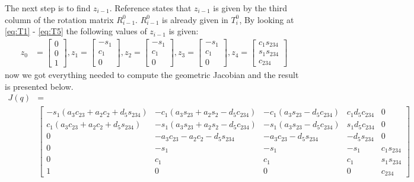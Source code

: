 The next step is to find $z_{i-1}$. Reference \cite{Siciliano} states that $z_{i-1}$ is given by the third column of the rotation matrix $R_{i-1}^0$. $R_{i-1}^0$ is already given in $T_i^0$, By looking at \eqref{eq:T1} - \eqref{eq:T5} the following values of $z_{i-1}$ is given:
\begin{align*}
    z_0 &= \begin{bmatrix}0\\0\\1\end{bmatrix},
    z_1 = \begin{bmatrix}-s_1\\c_1\\0\end{bmatrix},
    z_2 = \begin{bmatrix}-s_1\\c_1\\0\end{bmatrix},
    z_3 = \begin{bmatrix}-s_1\\c_1\\0\end{bmatrix},
    z_4 = \begin{bmatrix}c_1s_{234}\\s_1s_{234}\\c_{234}\end{bmatrix}
\end{align*}
now we got everything needed to compute the geometric Jacobian and the result is presented below.
\begin{align*}
    J(q) &= \\
    &\begin{bmatrix}
        -s_1(a_3c_{23} + a_2c_{2} + d_5s_{234}) & 
        -c_1(a_3s_{23} + a_2s_{2} - d_5c_{234}) & 
        -c_1(a_3s_{23} - d_5c_{234})            & 
        c_1d_5c_{234}                           & 
        0\\
        c_1(a_3c_{23} + a_2c_{2} + d_5s_{234})  & 
        -s_1(a_3s_{23} + a_2s_{2} - d_5c_{234}) & 
        -s_1(a_3s_{23} - d_5c_{234})            & 
        s_1d_5c_{234}                           & 
        0\\
        0                                       &
        -a_3c_{23}- a_2c_2 - d_5s_{234}         &
        -a_3c_{23} - d_5s_{234}                 &
        -d_5s_{234}                             &
        0\\
        0                                       &
        -s_1                                    &
        -s_1                                    &
        -s_1                                    &
        c_1s_{234}\\
        0                                       &
        c_1&
        c_1&
        c_1&
        s_1s_{234}\\
        1& 0 & 0 & 0 & c_{234}
    \end{bmatrix}
\end{align*}
